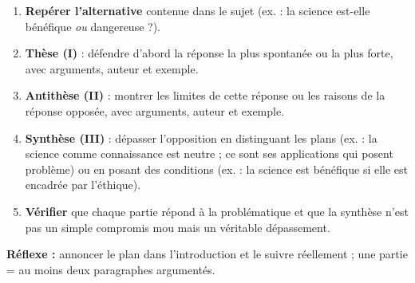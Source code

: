 \documentclass[11pt]{article}
\begin{document}
\begin{methode}
\begin{enumerate}
\item \textbf{Repérer l'alternative} contenue dans le sujet (ex. : la science est-elle bénéfique \emph{ou} dangereuse ?).
\item \textbf{Thèse (I)} : défendre d'abord la réponse la plus spontanée ou la plus forte, avec arguments, auteur et exemple.
\item \textbf{Antithèse (II)} : montrer les limites de cette réponse ou les raisons de la réponse opposée, avec arguments, auteur et exemple.
\item \textbf{Synthèse (III)} : dépasser l'opposition en distinguant les plans (ex. : la science comme connaissance est neutre ; ce sont ses applications qui posent problème) ou en posant des conditions (ex. : la science est bénéfique si elle est encadrée par l'éthique).
\item \textbf{Vérifier} que chaque partie répond à la problématique et que la synthèse n'est pas un simple compromis mou mais un véritable dépassement.
\end{enumerate}
\textbf{Réflexe :} annoncer le plan dans l'introduction et le suivre réellement ; une partie = au moins deux paragraphes argumentés.
\end{methode}
\end{document}
